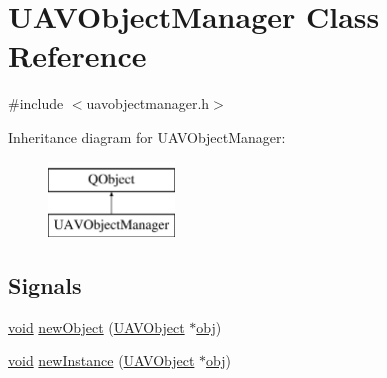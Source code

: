 \hypertarget{class_u_a_v_object_manager}{\section{U\-A\-V\-Object\-Manager Class Reference}
\label{class_u_a_v_object_manager}
}


{\ttfamily \#include $<$uavobjectmanager.\-h$>$}

Inheritance diagram for U\-A\-V\-Object\-Manager\-:\begin{figure}[H]
\begin{center}
\leavevmode
\includegraphics[height=2.000000cm]{class_u_a_v_object_manager}
\end{center}
\end{figure}
\subsection*{Signals}
\begin{DoxyCompactItemize}
\item 
\hyperlink{group___u_a_v_objects_plugin_ga444cf2ff3f0ecbe028adce838d373f5c}{void} \hyperlink{group___u_a_v_objects_plugin_gaf8c983e30ce7ebac3d4ef742d427b8fe}{new\-Object} (\hyperlink{class_u_a_v_object}{U\-A\-V\-Object} $\ast$\hyperlink{glext_8h_a0c0d4701a6c89f4f7f0640715d27ab26}{obj})
\item 
\hyperlink{group___u_a_v_objects_plugin_ga444cf2ff3f0ecbe028adce838d373f5c}{void} \hyperlink{group___u_a_v_objects_plugin_ga7787ebe5de616d95116d5a4b360b6773}{new\-Instance} (\hyperlink{class_u_a_v_object}{U\-A\-V\-Object} $\ast$\hyperlink{glext_8h_a0c0d4701a6c89f4f7f0640715d27ab26}{obj})
\end{DoxyCompactItemize}
